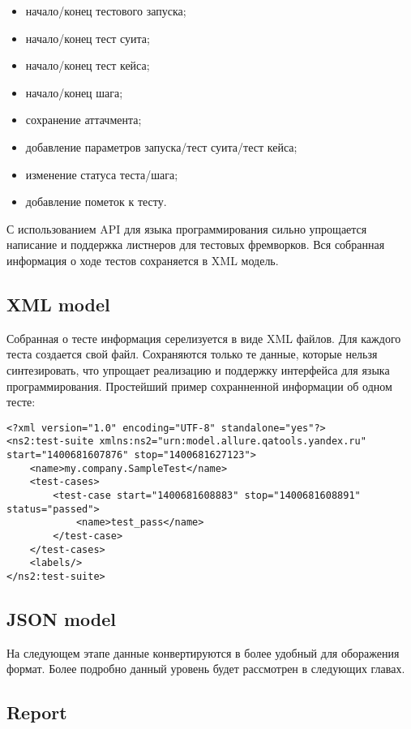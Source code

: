 \begin{itemize}
\item начало/конец тестового запуска;
\item начало/конец тест суита;
\item начало/конец тест кейса;
\item начало/конец шага;
\item сохранение аттачмента;
\item добавление параметров запуска/тест суита/тест кейса;
\item изменение статуса теста/шага;
\item добавление пометок к тесту.
\end{itemize}

С использованием API для языка программирования сильно упрощается написание и поддержка листнеров для тестовых фремворков. Вся собранная информация о ходе тестов сохраняется в XML модель. 

\subsection{XML model}

Собранная о тесте информация серелизуется в виде XML файлов. Для каждого теста создается свой файл. Сохраняются только те данные, которые нельзя синтезировать, что упрощает реализацию и поддержку интерфейса для языка программирования. Простейший пример сохранненной информации об одном тесте:

\begin{lstlisting}[style=XML]
<?xml version="1.0" encoding="UTF-8" standalone="yes"?>
<ns2:test-suite xmlns:ns2="urn:model.allure.qatools.yandex.ru" start="1400681607876" stop="1400681627123">
    <name>my.company.SampleTest</name>
    <test-cases>
        <test-case start="1400681608883" stop="1400681608891" status="passed">
            <name>test_pass</name>
        </test-case>
    </test-cases>
    <labels/>
</ns2:test-suite>
\end{lstlisting}

\subsection{JSON model}

На следующем этапе данные конвертируются в более удобный для оборажения формат. Более подробно данный уровень будет рассмотрен в следующих главах.

\subsection{Report}

